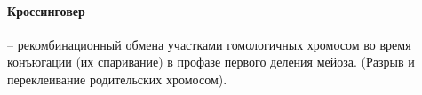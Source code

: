 \paragraph{Кроссинговер} -- рекомбинационный обмена участками гомологичных хромосом во время конъюгации (их спаривание) в профазе первого деления мейоза. (Разрыв и переклеивание родительских хромосом).